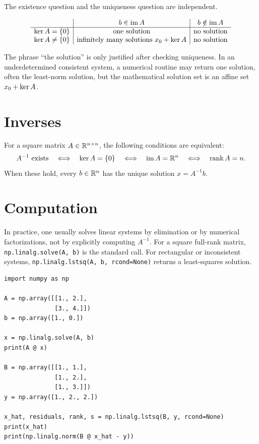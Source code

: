 The existence question and the uniqueness question are independent.

\[
\begin{array}{c|c|c}
 & b\in\operatorname{im} A & b\notin\operatorname{im} A\\
\hline
\operatorname{ker} A=\{0\}
& \text{one solution}
& \text{no solution}\\
\operatorname{ker} A\ne\{0\}
& \text{infinitely many solutions }x_0+\operatorname{ker} A
& \text{no solution}
\end{array}
\]

\begin{warningbox}
The phrase ``the solution'' is only justified after checking uniqueness. In an
underdetermined consistent system, a numerical routine may return one
solution, often the least-norm solution, but the mathematical solution set is
an affine set $x_0+\operatorname{ker} A$.
\end{warningbox}

\section{Inverses}

For a square matrix $A\in\mathbb{R}^{n\times n}$, the following conditions are
equivalent:
\[
  A^{-1}\text{ exists}
  \quad\Longleftrightarrow\quad
  \operatorname{ker} A=\{0\}
  \quad\Longleftrightarrow\quad
  \operatorname{im} A=\mathbb{R}^n
  \quad\Longleftrightarrow\quad
  \operatorname{rank} A=n.
\]
When these hold, every $b\in\mathbb{R}^n$ has the unique solution $x=A^{-1}b$.

\section{Computation}

In practice, one usually solves linear systems by elimination or by numerical
factorizations, not by explicitly computing $A^{-1}$. For a square full-rank
matrix, \texttt{np.linalg.solve(A, b)} is the standard call. For rectangular
or inconsistent systems, \texttt{np.linalg.lstsq(A, b, rcond=None)} returns a
least-squares solution.

\begin{lstlisting}
import numpy as np

A = np.array([[1., 2.],
              [3., 4.]])
b = np.array([1., 0.])

x = np.linalg.solve(A, b)
print(A @ x)

B = np.array([[1., 1.],
              [1., 2.],
              [1., 3.]])
y = np.array([1., 2., 2.])

x_hat, residuals, rank, s = np.linalg.lstsq(B, y, rcond=None)
print(x_hat)
print(np.linalg.norm(B @ x_hat - y))
\end{lstlisting}

